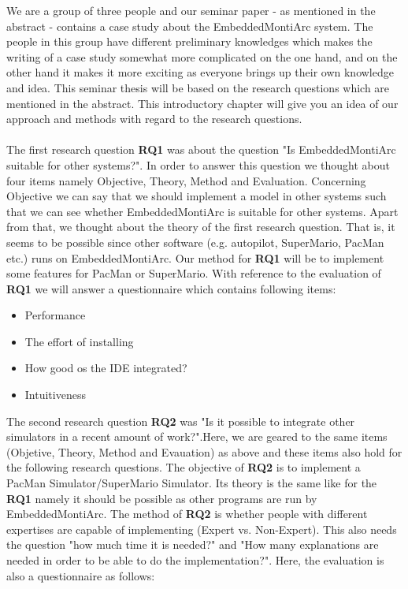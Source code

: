 We are a group of three people and our seminar paper - as mentioned in the abstract - contains a case study about the EmbeddedMontiArc system. The people in this group have different preliminary knowledges which makes the writing of a case study somewhat more complicated on the one hand, and on the other hand it makes it more exciting as everyone brings up their own knowledge and idea. This seminar thesis will be based on the research questions which are mentioned in the abstract. This introductory chapter will give you an idea of our approach and methods with regard to the research questions.
\\ \\
The first research question \textbf{RQ1} was about the question "Is EmbeddedMontiArc suitable for other systems?". In order to answer this question we thought about four items namely Objective, Theory, Method and Evaluation. Concerning Objective we can say that we should implement a model in other systems such that we can see whether EmbeddedMontiArc is suitable for other systems. Apart from that, we thought about the theory of the first research question. That is, it seems to be possible since other software (e.g. autopilot, SuperMario, PacMan etc.) runs on EmbeddedMontiArc. Our method for \textbf{RQ1} will be to implement some features for PacMan or SuperMario. With reference to the evaluation of \textbf{RQ1} we will answer a questionnaire which contains following items:
\begin{itemize}
	\item Performance
	\item The effort of installing
	\item How good os the IDE integrated?
	\item Intuitiveness
\end{itemize}
The second research question \textbf{RQ2} was "Is it possible to integrate other simulators in a recent amount of work?".Here, we are geared to the same items (Objetive, Theory, Method and Evauation) as above and these items also hold for the following research questions. The objective of \textbf{RQ2} is to implement a PacMan Simulator/SuperMario Simulator. Its theory is the same like for the \textbf{RQ1} namely it should be possible as other programs are run by EmbeddedMontiArc. The method of \textbf{RQ2} is whether people with different expertises are capable of implementing (Expert vs. Non-Expert). This also needs the question "how much time it is needed?" and "How many explanations are needed in order to be able to do the implementation?". Here, the evaluation is also a questionnaire as follows:
